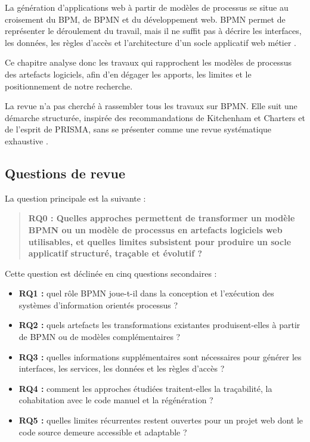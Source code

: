 \label{chap:chap2-revu}


La génération d'applications web à partir de modèles de processus se situe au
croisement du BPM, de BPMN et du développement web. BPMN permet de représenter
le déroulement du travail, mais il ne suffit pas à décrire les interfaces, les
données, les règles d'accès et l'architecture d'un socle applicatif web métier
\cite{omg2013bpmn}. 

Ce chapitre analyse donc les travaux qui rapprochent les
modèles de processus des artefacts logiciels, afin d'en dégager les apports, les
limites et le positionnement de notre recherche.


La revue n'a pas cherché à rassembler tous les travaux sur BPMN. Elle suit une
démarche structurée, inspirée des recommandations de Kitchenham et Charters et
de l'esprit de PRISMA, sans se présenter comme une revue systématique exhaustive
\cite{kitchenham2007,prisma2020}.

\subsection{Questions de revue}

La question principale est la suivante :

\begin{quote}
\textbf{RQ0 : Quelles approches permettent de transformer un modèle BPMN ou un
modèle de processus en artefacts logiciels web utilisables, et quelles limites
subsistent pour produire un socle applicatif structuré, traçable et évolutif ?}
\end{quote}

Cette question est déclinée en cinq questions secondaires :

\begin{itemize}
    \item \textbf{RQ1 :} quel rôle BPMN joue-t-il dans la conception et
    l'exécution des systèmes d'information orientés processus ?
    \item \textbf{RQ2 :} quels artefacts les transformations existantes
    produisent-elles à partir de BPMN ou de modèles complémentaires ?
    \item \textbf{RQ3 :} quelles informations supplémentaires sont nécessaires
    pour générer les interfaces, les services, les données et les règles d'accès ?
    \item \textbf{RQ4 :} comment les approches étudiées traitent-elles la
    traçabilité, la cohabitation avec le code manuel et la régénération ?
    \item \textbf{RQ5 :} quelles limites récurrentes restent ouvertes pour un
    projet web dont le code source demeure accessible et adaptable ?
\end{itemize}

